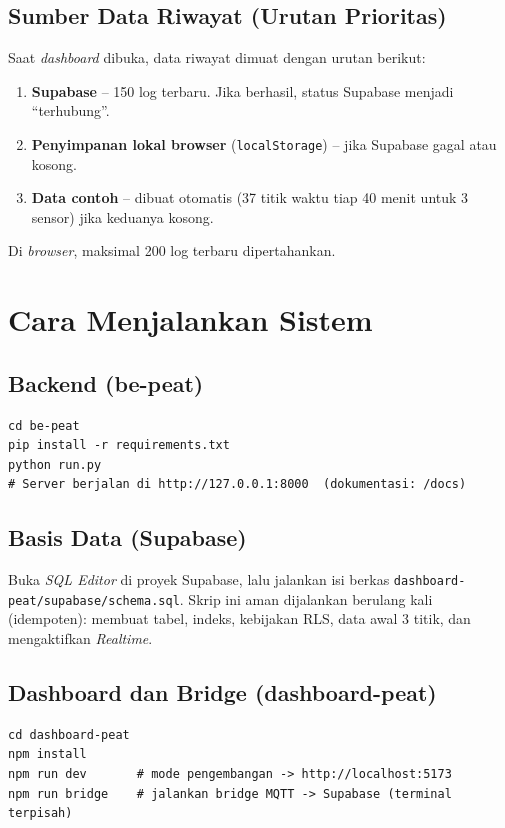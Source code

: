 \documentclass[11pt,a4paper]{article}
\newcommand{\kode}[1]{\texttt{#1}}
\begin{document}
\subsection{Sumber Data Riwayat (Urutan Prioritas)}
Saat \textit{dashboard} dibuka, data riwayat dimuat dengan urutan berikut:
\begin{enumerate}
  \item \textbf{Supabase} -- 150 log terbaru. Jika berhasil, status Supabase menjadi ``terhubung''.
  \item \textbf{Penyimpanan lokal browser} (\kode{localStorage}) -- jika Supabase gagal atau kosong.
  \item \textbf{Data contoh} -- dibuat otomatis (37 titik waktu tiap 40 menit untuk 3 sensor) jika keduanya kosong.
\end{enumerate}
Di \textit{browser}, maksimal 200 log terbaru dipertahankan.

\section{Cara Menjalankan Sistem}

\subsection{Backend (be-peat)}
\begin{lstlisting}
cd be-peat
pip install -r requirements.txt
python run.py
# Server berjalan di http://127.0.0.1:8000  (dokumentasi: /docs)
\end{lstlisting}

\subsection{Basis Data (Supabase)}
Buka \textit{SQL Editor} di proyek Supabase, lalu jalankan isi berkas
\kode{dashboard-peat/supabase/schema.sql}. Skrip ini aman dijalankan berulang kali (idempoten):
membuat tabel, indeks, kebijakan RLS, data awal 3 titik, dan mengaktifkan \textit{Realtime}.

\subsection{Dashboard dan Bridge (dashboard-peat)}
\begin{lstlisting}
cd dashboard-peat
npm install
npm run dev       # mode pengembangan -> http://localhost:5173
npm run bridge    # jalankan bridge MQTT -> Supabase (terminal terpisah)
\end{lstlisting}
\end{document}

